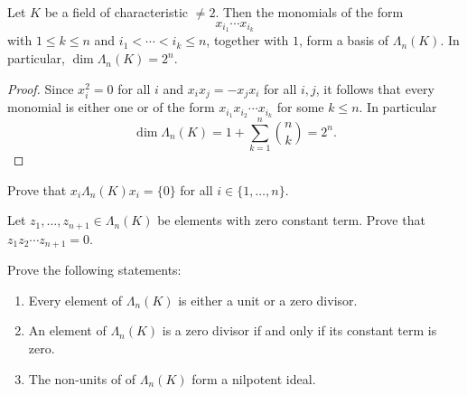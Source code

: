 
\begin{theorem}
    Let $K$ be a field of characteristic $\ne2$. Then 
    the monomials of the form 
    \[
    x_{i_1}\cdots x_{i_k}
    \]
    with $1\leq k\leq n$ and $i_1<\cdots<i_k\leq n$, together with $1$, form 
    a basis of $\Lambda_n(K)$. In particular, $\dim\Lambda_n(K)=2^n$. 
\end{theorem}

\begin{proof}
    Since $x_i^2=0$ for all $i$ and $x_ix_j=-x_jx_i$ for all $i,j$, it follows that 
    every monomial is either one or of the form $x_{i_1}x_{i_2}\cdots x_{i_k}$ 
    for some $k\leq n$. In particular 
    \[
    \dim\Lambda_n(K)=1+\sum_{k=1}^n\binom{n}{k}=2^n.
    \]
\end{proof}

\begin{exercise}
    Prove that $x_i\Lambda_n(K)x_i=\{0\}$ for all $i\in\{1,\dots,n\}$. 
\end{exercise}


\begin{exercise}
    Let $z_1,\dots,z_{n+1}\in\Lambda_n(K)$ be elements with zero constant term. Prove that 
    $z_1z_2\cdots z_{n+1}=0$. 
\end{exercise}


\begin{exercise}
    Prove the following statements:
    \begin{enumerate}
        \item Every element of $\Lambda_n(K)$ is either a unit or a zero divisor. 
        \item An element of $\Lambda_n(K)$ is a zero divisor if and only if its constant term is zero.
        \item The non-units of of $\Lambda_n(K)$ form a nilpotent ideal. 
    \end{enumerate}    
\end{exercise}

